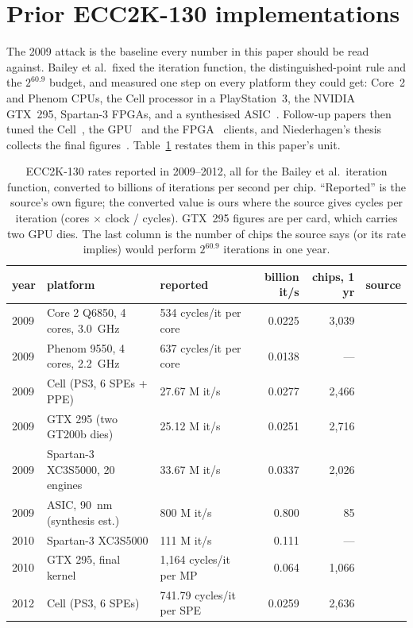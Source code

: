 \section{Prior ECC2K-130 implementations}
\label{sec:history}

The 2009 attack is the baseline every number in this paper should be
read against. Bailey et al.\ fixed the iteration function, the
distinguished-point rule and the $2^{60.9}$ budget, and measured one
step on every platform they could get: Core~2 and Phenom CPUs, the
Cell processor in a PlayStation~3, the NVIDIA GTX~295, Spartan-3
FPGAs, and a synthesised ASIC~\cite{bailey2009}. Follow-up papers
then tuned the Cell~\cite{bos2010cell}, the GPU~\cite{bernstein2010gpu}
and the FPGA~\cite{fan2010fpga} clients, and Niederhagen's thesis
collects the final figures~\cite{niederhagen2012thesis}.
Table~\ref{tab:history} restates them in this paper's unit.

\begin{table}[t]
\centering
\footnotesize
\setlength{\tabcolsep}{3pt}
\caption{ECC2K-130 rates reported in 2009--2012, all for the
  Bailey et al.\ iteration function, converted to billions of
  iterations per second per chip. ``Reported'' is the source's own
  figure; the converted value is ours where the source gives cycles
  per iteration (cores $\times$ clock / cycles). GTX~295 figures are
  per card, which carries two GPU dies. The last column is the number
  of chips the source says (or its rate implies) would perform
  $2^{60.9}$ iterations in one year.}
\label{tab:history}
\begin{tabular}{@{}lllrrr@{}}
\toprule
year & platform & reported & billion it/s & chips, 1 yr & source \\
\midrule
2009 & Core 2 Q6850, 4 cores, 3.0~GHz & 534 cycles/it per core & 0.0225 & 3{,}039 & \cite{bailey2009} \\
2009 & Phenom 9550, 4 cores, 2.2~GHz & 637 cycles/it per core & 0.0138 & --- & \cite{bailey2009} \\
2009 & Cell (PS3, 6 SPEs + PPE) & 27.67 M it/s & 0.0277 & 2{,}466 & \cite{bailey2009} \\
2009 & GTX 295 (two GT200b dies) & 25.12 M it/s & 0.0251 & 2{,}716 & \cite{bailey2009} \\
2009 & Spartan-3 XC3S5000, 20 engines & 33.67 M it/s & 0.0337 & 2{,}026 & \cite{bailey2009} \\
2009 & ASIC, 90~nm (synthesis est.) & 800 M it/s & 0.800 & 85 & \cite{bailey2009} \\
2010 & Spartan-3 XC3S5000 & 111 M it/s & 0.111 & --- & \cite{fan2010fpga} \\
2010 & GTX 295, final kernel & 1{,}164 cycles/it per MP & 0.064 & 1{,}066 & \cite{bernstein2010gpu,niederhagen2012thesis} \\
2012 & Cell (PS3, 6 SPEs) & 741.79 cycles/it per SPE & 0.0259 & 2{,}636 & \cite{niederhagen2012thesis} \\
\bottomrule
\end{tabular}
\end{table}


